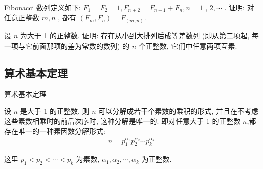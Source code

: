 \documentclass[aspectratio=169]{ctexbeamer}
\theoremstyle{definition}
\begin{document}
\begin{frame}[t]
	\begin{example}
		Fibonacci 数列定义如下:  $F_{1}=F_{2}=1, F_{n+2}=F_{n+1}+F_{n}, n=1$ ,  $2, \cdots$ . 证明: 对任意正整数 $m ,  n$ , 都有 $\left(F_{m}, F_{n}\right)=F_{(m, n)}$.
	\end{example}
\end{frame}

\begin{frame}[t]
	\begin{example}
		设 $n$ 为大于 1 的正整数. 证明: 存在从小到大排列后成等差数列 (即从第二项起, 每一项与它前面那项的差为常数的数列) 的 $n$ 个正整数, 它们中任意两项互素.
	\end{example}
\end{frame}

\subsection{算术基本定理}\setcounter{theorem}{0}
\begin{frame}{算术基本定理}
	\begin{theorem}[算术基本定理]
		设 $n$ 是大于 1 的正整数, 则 $n$ 可以分解成若干个素数的乘积的形式, 并且在不考虑这些素数相乘时的前后次序时, 这种分解是唯一的. 即对任意大于 1 的正整数 $n$,都存在唯一的一种素因数分解形式:
		\begin{align*}
			n=p_{1}^{\alpha_{1}} p_{2}^{\alpha_{2}} \cdots p_{k}^{\alpha_{k}}
		\end{align*}

		这里 $p_{1}<p_{2}<\cdots<p_{k}$ 为素数,  $\alpha_{1}, \alpha_{2}, \cdots, \alpha_{k}$ 为正整数.
	\end{theorem}
\end{frame}
\end{document}

